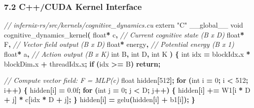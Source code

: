 \documentclass[
  11pt,
  a4paper,
]{article}
\newenvironment{Shaded}{\begin{snugshade}}{\end{snugshade}}
\newcommand{\AttributeTok}[1]{\textcolor[rgb]{0.13,0.29,0.53}{#1}}
\newcommand{\BuiltInTok}[1]{#1}
\newcommand{\CommentTok}[1]{\textcolor[rgb]{0.56,0.35,0.01}{\textit{#1}}}
\newcommand{\ControlFlowTok}[1]{\textcolor[rgb]{0.13,0.29,0.53}{\textbf{#1}}}
\newcommand{\DataTypeTok}[1]{\textcolor[rgb]{0.13,0.29,0.53}{#1}}
\newcommand{\DecValTok}[1]{\textcolor[rgb]{0.00,0.00,0.81}{#1}}
\newcommand{\FloatTok}[1]{\textcolor[rgb]{0.00,0.00,0.81}{#1}}
\newcommand{\NormalTok}[1]{#1}
\newcommand{\OperatorTok}[1]{\textcolor[rgb]{0.81,0.36,0.00}{\textbf{#1}}}
\newcommand{\StringTok}[1]{\textcolor[rgb]{0.31,0.60,0.02}{#1}}
\begin{document}
\subsubsection{7.2 C++/CUDA Kernel
Interface}\label{ccuda-kernel-interface}

\begin{Shaded}
\begin{Highlighting}[]
\CommentTok{// infernix{-}rs/src/kernels/cognitive\_dynamics.cu}
\AttributeTok{extern} \StringTok{"C"}\NormalTok{ \_\_global\_\_ }\DataTypeTok{void}
\NormalTok{cognitive\_dynamics\_kernel}\OperatorTok{(}
    \DataTypeTok{float}\OperatorTok{*}\NormalTok{ c}\OperatorTok{,}          \CommentTok{// Current cognitive state (B x D)}
    \DataTypeTok{float}\OperatorTok{*}\NormalTok{ F}\OperatorTok{,}          \CommentTok{// Vector field output (B x D)}
    \DataTypeTok{float}\OperatorTok{*}\NormalTok{ energy}\OperatorTok{,}     \CommentTok{// Potential energy (B x 1)}
    \DataTypeTok{float}\OperatorTok{*}\NormalTok{ a}\OperatorTok{,}          \CommentTok{// Action output (B x K)}
    \DataTypeTok{int}\NormalTok{ B}\OperatorTok{,} \DataTypeTok{int}\NormalTok{ D}\OperatorTok{,} \DataTypeTok{int}\NormalTok{ K}
\OperatorTok{)} \OperatorTok{\{}
    \DataTypeTok{int}\NormalTok{ idx }\OperatorTok{=}\NormalTok{ blockIdx}\OperatorTok{.}\NormalTok{x }\OperatorTok{*}\NormalTok{ blockDim}\OperatorTok{.}\NormalTok{x }\OperatorTok{+}\NormalTok{ threadIdx}\OperatorTok{.}\NormalTok{x}\OperatorTok{;}
    \ControlFlowTok{if} \OperatorTok{(}\NormalTok{idx }\OperatorTok{\textgreater{}=}\NormalTok{ B}\OperatorTok{)} \ControlFlowTok{return}\OperatorTok{;}
    
    \CommentTok{// Compute vector field: F = MLP(c)}
    \DataTypeTok{float}\NormalTok{ hidden}\OperatorTok{[}\DecValTok{512}\OperatorTok{];}
    \ControlFlowTok{for} \OperatorTok{(}\DataTypeTok{int}\NormalTok{ i }\OperatorTok{=} \DecValTok{0}\OperatorTok{;}\NormalTok{ i }\OperatorTok{\textless{}} \DecValTok{512}\OperatorTok{;}\NormalTok{ i}\OperatorTok{++)} \OperatorTok{\{}
\NormalTok{        hidden}\OperatorTok{[}\NormalTok{i}\OperatorTok{]} \OperatorTok{=} \FloatTok{0.0}\BuiltInTok{f}\OperatorTok{;}
        \ControlFlowTok{for} \OperatorTok{(}\DataTypeTok{int}\NormalTok{ j }\OperatorTok{=} \DecValTok{0}\OperatorTok{;}\NormalTok{ j }\OperatorTok{\textless{}}\NormalTok{ D}\OperatorTok{;}\NormalTok{ j}\OperatorTok{++)} \OperatorTok{\{}
\NormalTok{            hidden}\OperatorTok{[}\NormalTok{i}\OperatorTok{]} \OperatorTok{+=}\NormalTok{ W1}\OperatorTok{[}\NormalTok{i }\OperatorTok{*}\NormalTok{ D }\OperatorTok{+}\NormalTok{ j}\OperatorTok{]} \OperatorTok{*}\NormalTok{ c}\OperatorTok{[}\NormalTok{idx }\OperatorTok{*}\NormalTok{ D }\OperatorTok{+}\NormalTok{ j}\OperatorTok{];}
        \OperatorTok{\}}
\NormalTok{        hidden}\OperatorTok{[}\NormalTok{i}\OperatorTok{]} \OperatorTok{=}\NormalTok{ gelu}\OperatorTok{(}\NormalTok{hidden}\OperatorTok{[}\NormalTok{i}\OperatorTok{]} \OperatorTok{+}\NormalTok{ b1}\OperatorTok{[}\NormalTok{i}\OperatorTok{]);}
    \OperatorTok{\}}
    

\end{Highlighting}
\end{Shaded}
\end{document}
